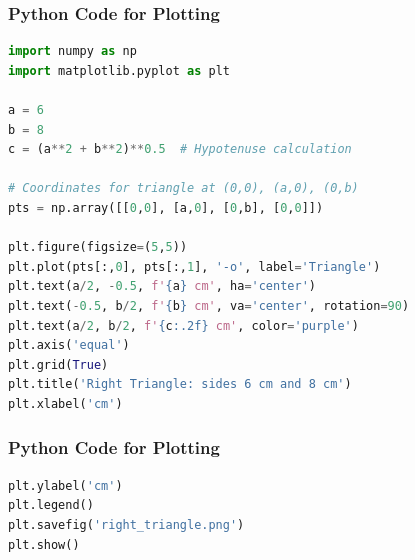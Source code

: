 \documentclass{beamer}
\theoremstyle{remark}
\numberwithin{equation}{section}
\begin{document}
\begin{frame}[fragile]
\frametitle{Python Code for Plotting}
\begin{lstlisting}[language=Python]
import numpy as np
import matplotlib.pyplot as plt

a = 6
b = 8
c = (a**2 + b**2)**0.5  # Hypotenuse calculation

# Coordinates for triangle at (0,0), (a,0), (0,b)
pts = np.array([[0,0], [a,0], [0,b], [0,0]])

plt.figure(figsize=(5,5))
plt.plot(pts[:,0], pts[:,1], '-o', label='Triangle')
plt.text(a/2, -0.5, f'{a} cm', ha='center')
plt.text(-0.5, b/2, f'{b} cm', va='center', rotation=90)
plt.text(a/2, b/2, f'{c:.2f} cm', color='purple')
plt.axis('equal')
plt.grid(True)
plt.title('Right Triangle: sides 6 cm and 8 cm')
plt.xlabel('cm')
\end{lstlisting}

\end{frame}
\begin{frame}[fragile]
\frametitle{Python Code for Plotting}
\begin{lstlisting}[language=Python]
plt.ylabel('cm')
plt.legend()
plt.savefig('right_triangle.png')
plt.show()
\end{lstlisting}

\end{frame}
\end{document}
